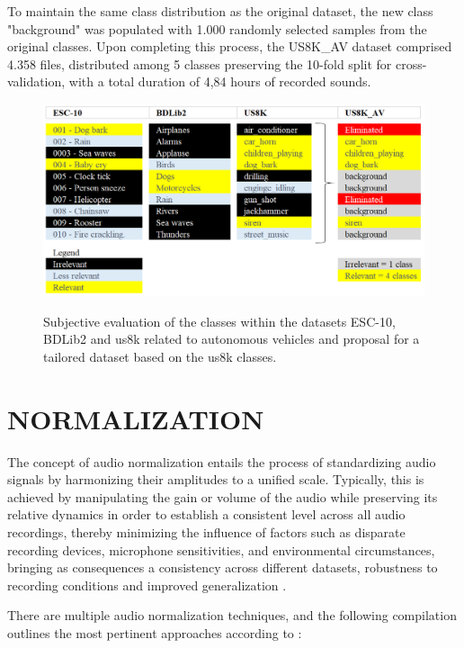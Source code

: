 To maintain the same class distribution as the original dataset, the new class "background" was populated with 1.000 randomly selected samples from the original classes. Upon completing this process, the US8K\_AV dataset comprised 4.358 files, distributed among 5 classes preserving the 10-fold split for cross-validation, with a total duration of 4,84 hours of recorded sounds. 

\begin{figure}[htbp]
    \raggedright
        \caption{Subjective evaluation of the classes within the datasets ESC-10, BDLib2 and \gls{us8k} related to autonomous vehicles and proposal for a tailored dataset based on the \gls{us8k} classes.}
        \includegraphics[width=1\textwidth]{resources/images/050-methods/Methods_dataset_US8K_AV.png}
        \label{fig:methods_dataset_US8K_AV}
\end{figure}


\section{NORMALIZATION}
\label{sec:methods_normalization}

The concept of audio normalization entails the process of standardizing audio signals by harmonizing their amplitudes to a unified scale. Typically, this is achieved by manipulating the gain or volume of the audio while preserving its relative dynamics in order to establish a consistent level across all audio recordings, thereby minimizing the influence of factors such as disparate recording devices, microphone sensitivities, and environmental circumstances, bringing as consequences a consistency across different datasets, robustness to recording conditions and improved generalization \cite{Mueller2016}.

There are multiple audio normalization techniques, and the following compilation outlines the most pertinent approaches according to \textcite{Mueller2021}:

